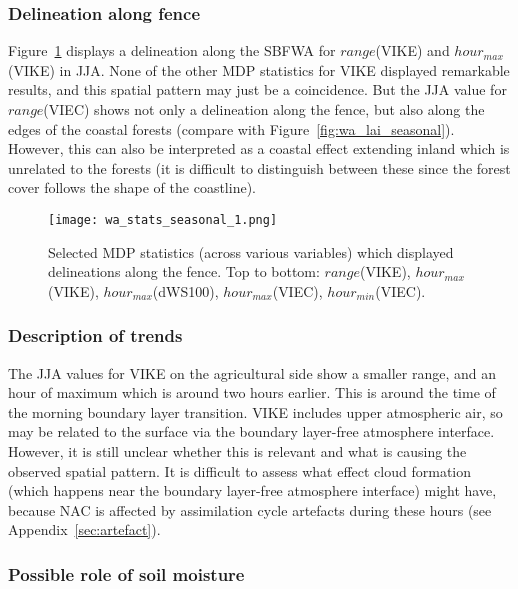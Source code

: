 \subsubsection{Delineation along fence}

Figure~\ref{fig:wa_stats_seasonal_1} displays a delineation along the \ac{SBFWA} for $range$(\acs{VIKE}) and $hour_{max}$(\acs{VIKE}) in \ac{JJA}. None of the other \ac{MDP} statistics for \ac{VIKE} displayed remarkable results, and this spatial pattern may just be a coincidence. But the \ac{JJA} value for $range$(\acs{VIEC}) shows not only a delineation along the fence, but also along the edges of the coastal forests (compare with Figure~\ref{fig:wa_lai_seasonal}). However, this can also be interpreted as a coastal effect extending inland which is unrelated to the forests (it is difficult to distinguish between these since the forest cover follows the shape of the coastline).

\begin{figure}[!htp]
	\centering
	\texttt{[image: wa\_stats\_seasonal\_1.png]}
	\caption[Selected MDP statistics with fence delineations]{Selected \ac{MDP} statistics (across various variables) which displayed delineations along the fence. Top to bottom: $range$(\acs{VIKE}), $hour_{max}$(\acs{VIKE}), $hour_{max}$(\acs{dWS100}), $hour_{max}$(\acs{VIEC}), $hour_{min}$(\acs{VIEC}).}
	\label{fig:wa_stats_seasonal_1}
\end{figure}

\subsubsection{Description of trends}

The \ac{JJA} values for \ac{VIKE} on the agricultural side show a smaller range, and an hour of maximum which is around two hours earlier. This is around the time of the morning boundary layer transition. \ac{VIKE} includes upper atmospheric air, so may be related to the surface via the boundary layer-free atmosphere interface. However, it is still unclear whether this is relevant and what is causing the observed spatial pattern. It is difficult to assess what effect cloud formation (which happens near the boundary layer-free atmosphere interface) might have, because \ac{NAC} is affected by assimilation cycle artefacts during these hours (see Appendix~\ref{sec:artefact}).

\subsubsection{Possible role of soil moisture}

